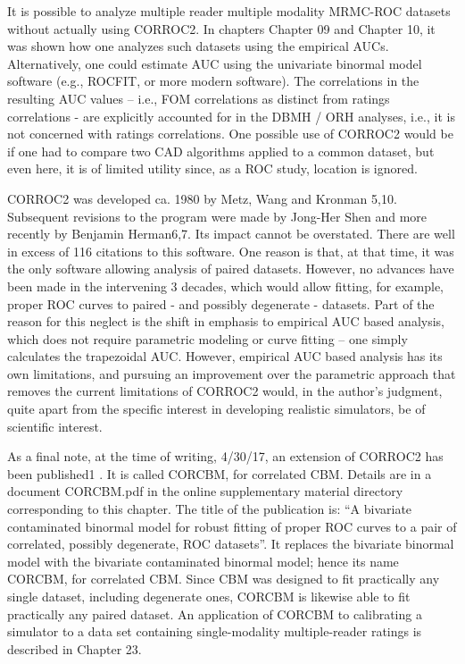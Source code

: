 \documentclass[
]{book}
\begin{document}
It is possible to analyze multiple reader multiple modality MRMC-ROC datasets without actually using CORROC2. In chapters Chapter 09 and Chapter 10, it was shown how one analyzes such datasets using the empirical AUCs. Alternatively, one could estimate AUC using the univariate binormal model software (e.g., ROCFIT, or more modern software). The correlations in the resulting AUC values -- i.e., FOM correlations as distinct from ratings correlations - are explicitly accounted for in the DBMH / ORH analyses, i.e., it is not concerned with ratings correlations. One possible use of CORROC2 would be if one had to compare two CAD algorithms applied to a common dataset, but even here, it is of limited utility since, as a ROC study, location is ignored.

CORROC2 was developed ca. 1980 by Metz, Wang and Kronman 5,10. Subsequent revisions to the program were made by Jong-Her Shen and more recently by Benjamin Herman6,7. Its impact cannot be overstated. There are well in excess of 116 citations to this software. One reason is that, at that time, it was the only software allowing analysis of paired datasets. However, no advances have been made in the intervening 3 decades, which would allow fitting, for example, proper ROC curves to paired - and possibly degenerate - datasets. Part of the reason for this neglect is the shift in emphasis to empirical AUC based analysis, which does not require parametric modeling or curve fitting -- one simply calculates the trapezoidal AUC. However, empirical AUC based analysis has its own limitations, and pursuing an improvement over the parametric approach that removes the current limitations of CORROC2 would, in the author's judgment, quite apart from the specific interest in developing realistic simulators, be of scientific interest.

As a final note, at the time of writing, 4/30/17, an extension of CORROC2 has been published1 \citep{zhai2017bivariate}. It is called CORCBM, for correlated CBM. Details are in a document CORCBM.pdf in the online supplementary material directory corresponding to this chapter. The title of the publication is: ``A bivariate contaminated binormal model for robust fitting of proper ROC curves to a pair of correlated, possibly degenerate, ROC datasets''. It replaces the bivariate binormal model with the bivariate contaminated binormal model; hence its name CORCBM, for correlated CBM. Since CBM was designed to fit practically any single dataset, including degenerate ones, CORCBM is likewise able to fit practically any paired dataset. An application of CORCBM to calibrating a simulator to a data set containing single-modality multiple-reader ratings is described in Chapter 23.
\end{document}
